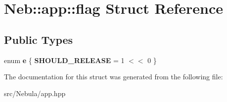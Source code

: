 \hypertarget{structNeb_1_1app_1_1flag}{\section{\-Neb\-:\-:app\-:\-:flag \-Struct \-Reference}
\label{structNeb_1_1app_1_1flag}
}
\subsection*{\-Public \-Types}
\begin{DoxyCompactItemize}
\item 
enum {\bfseries e} \{ {\bfseries \-S\-H\-O\-U\-L\-D\-\_\-\-R\-E\-L\-E\-A\-S\-E} =  1 $<$$<$ 0
 \}
\end{DoxyCompactItemize}


\-The documentation for this struct was generated from the following file\-:\begin{DoxyCompactItemize}
\item 
src/\-Nebula/app.\-hpp\end{DoxyCompactItemize}
